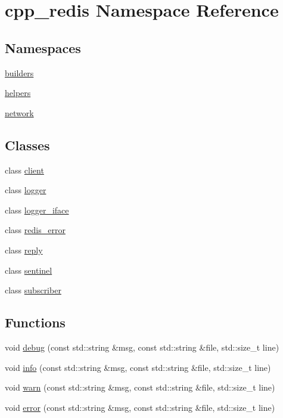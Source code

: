\hypertarget{namespacecpp__redis}{}\section{cpp\+\_\+redis Namespace Reference}
\label{namespacecpp__redis}
\subsection*{Namespaces}
\begin{DoxyCompactItemize}
\item 
 \hyperlink{namespacecpp__redis_1_1builders}{builders}
\item 
 \hyperlink{namespacecpp__redis_1_1helpers}{helpers}
\item 
 \hyperlink{namespacecpp__redis_1_1network}{network}
\end{DoxyCompactItemize}
\subsection*{Classes}
\begin{DoxyCompactItemize}
\item 
class \hyperlink{classcpp__redis_1_1client}{client}
\item 
class \hyperlink{classcpp__redis_1_1logger}{logger}
\item 
class \hyperlink{classcpp__redis_1_1logger__iface}{logger\+\_\+iface}
\item 
class \hyperlink{classcpp__redis_1_1redis__error}{redis\+\_\+error}
\item 
class \hyperlink{classcpp__redis_1_1reply}{reply}
\item 
class \hyperlink{classcpp__redis_1_1sentinel}{sentinel}
\item 
class \hyperlink{classcpp__redis_1_1subscriber}{subscriber}
\end{DoxyCompactItemize}
\subsection*{Functions}
\begin{DoxyCompactItemize}
\item 
void \hyperlink{namespacecpp__redis_a39d51d08722bb540293841deb56dd283}{debug} (const std\+::string \&msg, const std\+::string \&file, std\+::size\+\_\+t line)
\item 
void \hyperlink{namespacecpp__redis_a6ffd2c5578cbe29b80df00dc21e344ab}{info} (const std\+::string \&msg, const std\+::string \&file, std\+::size\+\_\+t line)
\item 
void \hyperlink{namespacecpp__redis_a8316739706654d185aed3966fad3ec89}{warn} (const std\+::string \&msg, const std\+::string \&file, std\+::size\+\_\+t line)
\item 
void \hyperlink{namespacecpp__redis_adeeea41e1e9c1190926b23f1002d03e2}{error} (const std\+::string \&msg, const std\+::string \&file, std\+::size\+\_\+t line)
\end{DoxyCompactItemize}
